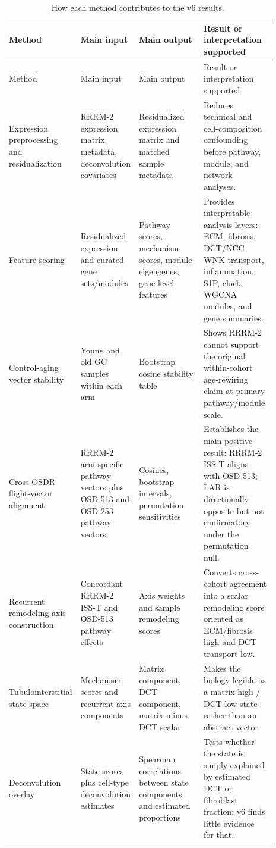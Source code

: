 \documentclass[11pt]{article}
\begin{document}
\begin{landscape}
\small
\setlength{\tabcolsep}{4pt}
\begin{longtable}{p{0.17\linewidth}p{0.20\linewidth}p{0.25\linewidth}p{0.27\linewidth}}
\caption{How each method contributes to the v6 results.}\\
\toprule
Method & Main input & Main output & Result or interpretation supported \\
\midrule
\endfirsthead
\toprule
Method & Main input & Main output & Result or interpretation supported \\
\midrule
\endhead
Expression preprocessing and residualization & RRRM-2 expression matrix, metadata, deconvolution covariates & Residualized expression matrix and matched sample metadata & Reduces technical and cell-composition confounding before pathway, module, and network analyses. \\
Feature scoring & Residualized expression and curated gene sets/modules & Pathway scores, mechanism scores, module eigengenes, gene-level features & Provides interpretable analysis layers: ECM, fibrosis, DCT/NCC-WNK transport, inflammation, S1P, clock, WGCNA modules, and gene summaries. \\
Control-aging vector stability & Young and old GC samples within each arm & Bootstrap cosine stability table & Shows RRRM-2 cannot support the original within-cohort age-rewiring claim at primary pathway/module scale. \\
Cross-OSDR flight-vector alignment & RRRM-2 arm-specific pathway vectors plus OSD-513 and OSD-253 pathway vectors & Cosines, bootstrap intervals, permutation sensitivities & Establishes the main positive result: RRRM-2 ISS-T aligns with OSD-513; LAR is directionally opposite but not confirmatory under the permutation null. \\
Recurrent remodeling-axis construction & Concordant RRRM-2 ISS-T and OSD-513 pathway effects & Axis weights and sample remodeling scores & Converts cross-cohort agreement into a scalar remodeling score oriented as ECM/fibrosis high and DCT transport low. \\
Tubulointerstitial state-space & Mechanism scores and recurrent-axis components & Matrix component, DCT component, matrix-minus-DCT scalar & Makes the biology legible as a matrix-high / DCT-low state rather than an abstract vector. \\
Deconvolution overlay & State scores plus cell-type deconvolution estimates & Spearman correlations between state components and estimated proportions & Tests whether the state is simply explained by estimated DCT or fibroblast fraction; v6 finds little evidence for that. \\

\end{longtable}
\end{landscape}
\end{document}
